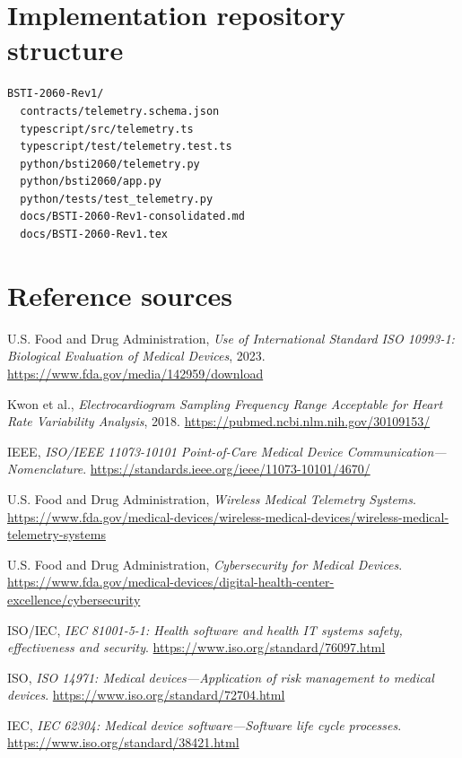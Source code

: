 \documentclass[11pt,a4paper]{article}
\begin{document}
\section{Implementation repository structure}\label{app:repository}
\begin{verbatim}
BSTI-2060-Rev1/
  contracts/telemetry.schema.json
  typescript/src/telemetry.ts
  typescript/test/telemetry.test.ts
  python/bsti2060/telemetry.py
  python/bsti2060/app.py
  python/tests/test_telemetry.py
  docs/BSTI-2060-Rev1-consolidated.md
  docs/BSTI-2060-Rev1.tex
\end{verbatim}

\section{Reference sources}\label{app:references}
\begin{enumerate}[label={[\arabic*]}]
  \item U.S. Food and Drug Administration, \emph{Use of International Standard ISO 10993-1: Biological Evaluation of Medical Devices}, 2023. \url{https://www.fda.gov/media/142959/download}
  \item Kwon et al., \emph{Electrocardiogram Sampling Frequency Range Acceptable for Heart Rate Variability Analysis}, 2018. \url{https://pubmed.ncbi.nlm.nih.gov/30109153/}
  \item IEEE, \emph{ISO/IEEE 11073-10101 Point-of-Care Medical Device Communication—Nomenclature}. \url{https://standards.ieee.org/ieee/11073-10101/4670/}
  \item U.S. Food and Drug Administration, \emph{Wireless Medical Telemetry Systems}. \url{https://www.fda.gov/medical-devices/wireless-medical-devices/wireless-medical-telemetry-systems}
  \item U.S. Food and Drug Administration, \emph{Cybersecurity for Medical Devices}. \url{https://www.fda.gov/medical-devices/digital-health-center-excellence/cybersecurity}
  \item ISO/IEC, \emph{IEC 81001-5-1: Health software and health IT systems safety, effectiveness and security}. \url{https://www.iso.org/standard/76097.html}
  \item ISO, \emph{ISO 14971: Medical devices—Application of risk management to medical devices}. \url{https://www.iso.org/standard/72704.html}
  \item IEC, \emph{IEC 62304: Medical device software—Software life cycle processes}. \url{https://www.iso.org/standard/38421.html}
\end{enumerate}
\end{document}
